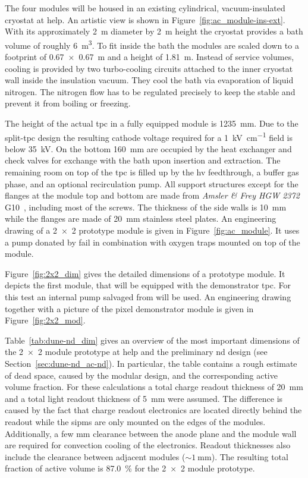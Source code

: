 The four modules will be housed in an existing cylindrical, vacuum-insulated cryostat at \gls{help}.
An artistic view is shown in Figure~\ref{fig:ac_module-ins-ext}.
With its approximately \SI{2}{\metre} diameter by \SI{2}{\metre} height the cryostat provides a \lar{} bath volume of roughly \SI{6}{\metre\cubed}.
To fit inside the bath the modules are scaled down to a footprint of \SI{0.67 x 0.67}{\metre} and a height of \SI{1.81}{\metre}.
Instead of service volumes, cooling is provided by two turbo-cooling circuits attached to the inner cryostat wall inside the insulation vacuum.
They cool the \lar{} bath via evaporation of liquid nitrogen.
The nitrogen flow has to be regulated precisely to keep the \lar{} stable and prevent it from boiling or freezing.

The height of the actual \gls{tpc} in a fully equipped module is \SI{1235}{\milli\metre}.
Due to the split-\gls{tpc} design the resulting cathode voltage required for a \SI{1}{\kilo\volt\per\centi\metre} field is below \SI{35}{\kilo\volt}.
On the bottom \SI{160}{\milli\metre} are occupied by the heat exchanger and check valves for \lar{} exchange with the bath upon insertion and extraction.
The remaining room on top of the \gls{tpc} is filled up by the \gls{hv} feedthrough, a buffer gas phase, and an optional recirculation pump.
All support structures except for the flanges at the module top and bottom are made from \emph{Amsler \& Frey HGW 2372} G10~\cite{g10}, including most of the screws.
The thickness of the side walls is \SI{10}{\milli\metre} while the flanges are made of \SI{20}{\milli\metre} stainless steel plates.
An engineering drawing of a \num{2 x 2} prototype module is given in Figure~\ref{fig:ac_module}.
It uses a \lar{} pump donated by \gls{fail} in combination with oxygen traps mounted on top of the module.

Figure~\ref{fig:2x2_dim} gives the detailed dimensions of a prototype module.
It depicts the first module, that will be equipped with the demonstrator \gls{tpc}.
For this test an internal pump salvaged from \AT{} will be used.
An engineering drawing together with a picture of the pixel demonstrator module is given in Figure~\ref{fig:2x2_mod}.

Table~\ref{tab:dune-nd_dim} gives an overview of the most important dimensions of the \num{2 x 2} module prototype at \gls{help} and the preliminary \dune{} \gls{nd} design (see Section~\ref{sec:dune-nd_ac-nd}).
In particular, the table contains a rough estimate of dead space, caused by the modular design, and the corresponding active volume fraction.
For these calculations a total charge readout thickness of \SI{20}{\milli\metre} and a total light readout thickness of \SI{5}{\milli\metre} were assumed.
The difference is caused by the fact that charge readout electronics are located directly behind the readout while the \glspl{sipm} are only mounted on the edges of the \AL{} modules.
Additionally, a few \si{\milli\metre} clearance between the anode plane and the module wall are required for convection cooling of the \larpix{} electronics.
Readout thicknesses also include the clearance between adjacent modules ($\sim{\SI{1}{\milli\metre}}$).
The resulting total fraction of active volume is \SI{87.0}{\percent} for the \num{2 x 2} module prototype.

